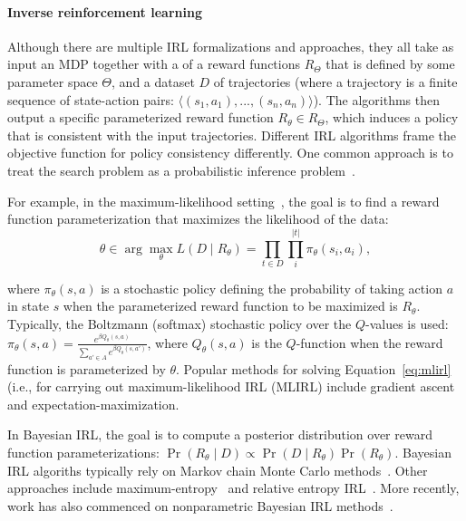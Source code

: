 
\vspace{\up}
\paragraph{Inverse reinforcement learning}

Although there are multiple IRL formalizations and approaches, they
all take as input an MDP together with a  of a reward
functions $R_\Theta$ that is defined by some parameter space $\Theta$,
and a dataset $D$ of trajectories (where a trajectory is a finite
sequence of state-action pairs: $\langle (s_1, a_1), ..., (s_n, a_n)
\rangle$). The algorithms then output a specific parameterized reward
function $R_\theta \in R_\Theta$, which induces a policy that is
consistent with the input trajectories.
%
Different IRL algorithms frame the objective function for policy
consistency differently. One common approach is to treat the
search problem as a probabilistic inference
problem~\cite{babes11,lopes2009active,ramachandran2007bayesian,ziebart2008maximum}. 

For example, in the maximum-likelihood setting~\cite{babes11}, the
goal is to find a reward function parameterization that maximizes
the likelihood of the data:
%
\begin{equation}
\label{eq:mlirl}
\theta \in \arg\max_{\theta} L(D \mid R_{\theta}) = \prod_{t \in D} \prod_i^{|t|} \pi_{\theta}(s_i, a_i),
\end{equation}

\noindent
where $\pi_{\theta}(s, a)$ is a stochastic policy defining the
probability of taking action $a$ in state $s$ when the parameterized
reward function to be maximized is $R_{\theta}$. Typically, the
Boltzmann (softmax) stochastic policy over the $Q$-values is used:
$\pi_{\theta}(s, a) = \frac{e^{\beta Q_{\theta}(s,a)}}{\sum_{a' \in A}
  e^{\beta Q_{\theta}(s,a')}}$, where $Q_\theta(s, a)$ is the $Q$-function
when the reward function is parameterized by $\theta$.
%
Popular methods for solving Equation~\ref{eq:mlirl} (i.e., for
carrying out maximum-likelihood IRL (MLIRL) include gradient ascent
and expectation-maximization.

In Bayesian IRL, the goal is to compute a posterior distribution over
reward function parameterizations:
%
$\Pr(R_{\theta} \mid D) \propto \Pr(D \mid R_{\theta}) \Pr(R_\theta)$.
%
Bayesian IRL algoriths typically rely on Markov chain Monte Carlo
methods~\cite{journals/corr/abs-1208-2112,ramachandran2007bayesian}.
%
Other approaches include maximum-entropy~\cite{ziebart2008maximum}
and relative entropy IRL~\cite{BoulariasKP2011}. 
%
More recently, work has also commenced on
nonparametric Bayesian IRL methods~\cite{Choi:2012:NBI:2999134.2999169,Michini2012}.

